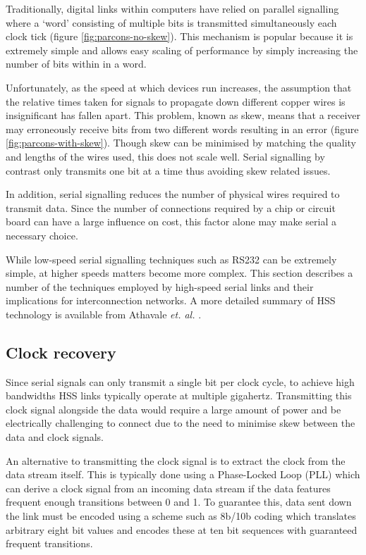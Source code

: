 		Traditionally, digital links within computers have relied on parallel
		signalling where a `word' consisting of multiple bits is transmitted
		simultaneously each clock tick (figure \ref{fig:parcons-no-skew}). This
		mechanism is popular because it is extremely simple and allows easy scaling
		of performance by simply increasing the number of bits within in a word.
		
		Unfortunately, as the speed at which devices run increases, the assumption
		that the relative times taken for signals to propagate down different copper
		wires is insignificant has fallen apart. This problem, known as skew, means
		that a receiver may erroneously receive bits from two different words
		resulting in an error (figure \ref{fig:parcons-with-skew}). Though skew can
		be minimised by matching the quality and lengths of the wires used, this
		does not scale well. Serial signalling by contrast only transmits one bit
		at a time thus avoiding skew related issues.
		
		In addition, serial signalling reduces the number of physical wires required
		to transmit data. Since the number of connections required by a chip or
		circuit board can have a large influence on cost, this factor alone may make
		serial a necessary choice.
		
		While low-speed serial signalling techniques such as RS232 can be extremely
		simple, at higher speeds matters become more complex. This section describes
		a number of the techniques employed by high-speed serial links and their
		implications for interconnection networks. A more detailed summary of HSS
		technology is available from Athavale \emph{et. al.} \cite{athavale05}.
		
		\subsection{Clock recovery}
			
			
			Since serial signals can only transmit a single bit per clock cycle, to
			achieve high bandwidths HSS links typically operate at multiple gigahertz.
			Transmitting this clock signal alongside the data would require a large
			amount of power and be electrically challenging to connect due to the need
			to minimise skew between the data and clock signals.
			
			An alternative to transmitting the clock signal is to extract the clock
			from the data stream itself. This is typically done using a Phase-Locked
			Loop (PLL) which can derive a clock signal from an incoming data stream if
			the data features frequent enough transitions between 0 and 1. To
			guarantee this, data sent down the link must be encoded using a scheme
			such as 8b/10b coding \cite{widmer83} which translates arbitrary eight bit
			values and encodes these at ten bit sequences with guaranteed frequent
			transitions.
			

